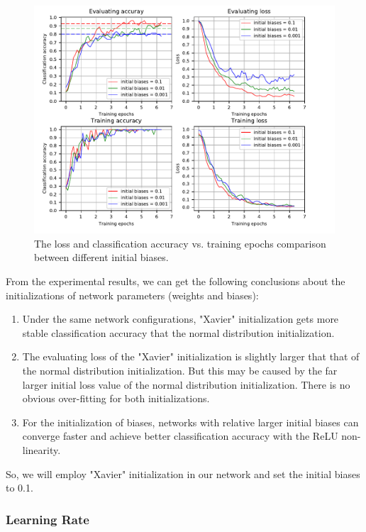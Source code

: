  \begin{figure}
	\includegraphics[trim=0cm 0cm 0cm 0cm]{fig01/plot_biases.pdf}
	\caption{The loss and classification accuracy vs. training epochs comparison between different initial biases.}
	\label{fig:plot_biases}
\end{figure}

From the experimental results, we can get the following conclusions about the initializations of network parameters (weights and biases): 
\begin{enumerate}
	\item Under the same network configurations, "Xavier" initialization gets more stable classification accuracy that the normal distribution initialization. 
	\item The evaluating loss of the "Xavier" initialization is slightly larger that that of the normal distribution initialization. But this may be caused by the far larger initial loss value of the normal distribution initialization. There is no obvious over-fitting for both initializations.
	\item For the initialization of biases, networks with relative larger initial biases can converge faster and achieve better classification accuracy with the ReLU non-linearity.
\end{enumerate} 
So, we will employ "Xavier" initialization in our network and set the initial biases to 0.1. 
\subsubsection{Learning Rate}
